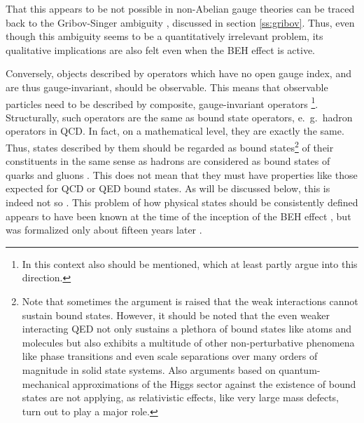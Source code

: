 \documentclass[final,twoside,12pt]{article}
\newcommand*{\1}{1\!\!\!\bot}
\begin{document}
That this appears to be not possible \cite{Haag:1992hx} in non-Abelian gauge theories can be traced back to the Gribov-Singer ambiguity \cite{Ilderton:2007qy,Lavelle:2011yc,Heinzl:2008bu}, discussed in section \ref{ss:gribov}. Thus, even though this ambiguity seems to be a quantitatively irrelevant problem, its qualitative implications are also felt even when the BEH effect is active.

Conversely, objects described by operators which have no open gauge index, and are thus gauge-invariant, should be observable. This means that observable particles need to be described by composite, gauge-invariant operators \cite{Banks:1979fi,Frohlich:1980gj,Frohlich:1981yi,Strocchi:2015uaa,Attard:2017sdn,Kondo:2018qus,DeWitt:2003pm,Karsch:1996aw,Philipsen:1996af,Philipsen:1997rq,Laine:1997nq,Maas:2012tj}\footnote{In this context also \cite{Lavelle:1994rh,Chernodub:2008rz,Faddeev:2008qc,Ilderton:2010tf} should be mentioned, which at least partly argue into this direction.}. Structurally, such operators are the same as bound state operators, e.\ g.\ hadron operators in QCD. In fact, on a mathematical level, they are exactly the same. Thus, states described by them should be regarded as bound states\footnote{Note that sometimes the argument is raised that the weak interactions cannot sustain bound states. However, it should be noted that the even weaker interacting QED not only sustains a plethora of bound states like atoms and molecules but also exhibits a multitude of other non-perturbative phenomena like phase transitions and even scale separations over many orders of magnitude in solid state systems. Also arguments based on quantum-mechanical approximations of the Higgs sector against the existence of bound states \cite{Grifols:1991gw} are not applying, as relativistic effects, like very large mass defects, turn out to play a major role.} of their constituents in the same sense as hadrons are considered as bound states of quarks and gluons \cite{Maas:2012tj}. This does not mean that they must have properties like those expected for QCD or QED bound states. As will be discussed below, this is indeed not so \cite{Frohlich:1980gj,Frohlich:1981yi,Maas:2012tj}. This problem of how physical states should be consistently defined appears to have been known at the time of the inception of the BEH effect \cite{Ivanov:pc,Strocchi:1977za,Englert:2004yk,Englert:2014zpa}, but was formalized only about fifteen years later \cite{Banks:1979fi,Frohlich:1980gj}.
\end{document}
